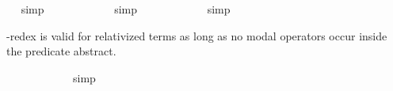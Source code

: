 \begin{isabellebody}
\ %
%
\isamarkupfalse%
\ simp%
%
%
\isanewline
\ \isamarkupfalse%
\ {\isachardoublequoteopen}{\isasymlfloor}{\isacharparenleft}{\isacharparenleft}{\isasymlambda}{\isasymalpha}{\isachardot}\ \isactrlbold {\isasymbox}{\isasymphi}\ {\isasymalpha}{\isacharparenright}\ {\isacharparenleft}{\isasymtau}{\isacharcolon}{\isacharcolon}{\isasymup}{\isasymzero}{\isacharparenright}{\isacharparenright}\ \isactrlbold {\isasymleftrightarrow}\ {\isacharparenleft}\isactrlbold {\isasymbox}{\isasymphi}\ {\isasymtau}{\isacharparenright}{\isasymrfloor}{\isachardoublequoteclose}%
\ %
%
\isamarkupfalse%
\ simp%
%
%
\isanewline
\ \isamarkupfalse%
\ {\isachardoublequoteopen}{\isasymlfloor}{\isacharparenleft}{\isacharparenleft}{\isasymlambda}{\isasymalpha}{\isachardot}\ \isactrlbold {\isasymbox}{\isasymphi}\ {\isasymalpha}{\isacharparenright}\ {\isacharparenleft}{\isasymtau}{\isacharcolon}{\isacharcolon}{\isasymzero}{\isacharparenright}{\isacharparenright}\ \isactrlbold {\isasymleftrightarrow}\ {\isacharparenleft}\isactrlbold {\isasymbox}{\isasymphi}\ {\isasymtau}{\isacharparenright}{\isasymrfloor}{\isachardoublequoteclose}%
\ %
%
\isamarkupfalse%
\ simp%
%
%
%
\begin{isamarkuptext}%
\isa{{\isasymbeta}{\isasymeta}}-redex is valid for relativized terms as long as no modal operators occur inside the predicate abstract.%
\end{isamarkuptext}\isamarkuptrue%
\ \isamarkupfalse%
\ {\isachardoublequoteopen}{\isasymlfloor}{\isacharparenleft}{\isacharparenleft}{\isasymlambda}{\isasymalpha}{\isachardot}\ {\isasymphi}\ {\isasymalpha}{\isacharparenright}\ {\isasymdownharpoonleft}{\isacharparenleft}{\isasymtau}{\isacharcolon}{\isacharcolon}{\isasymup}{\isasymzero}{\isacharparenright}{\isacharparenright}\ \isactrlbold {\isasymleftrightarrow}\ {\isacharparenleft}{\isasymphi}\ {\isasymdownharpoonleft}{\isasymtau}{\isacharparenright}{\isasymrfloor}{\isachardoublequoteclose}%
\ %
%
\isamarkupfalse%
\ simp%
%
%
\isanewline
\ \isamarkupfalse%
\ {\isachardoublequoteopen}{\isasymlfloor}{\isacharparenleft}{\isacharparenleft}{\isasymlambda}{\isasymalpha}{\isachardot}\ \isactrlbold {\isasymbox}{\isasymphi}\ {\isasymalpha}{\isacharparenright}\ {\isasymdownharpoonleft}{\isacharparenleft}{\isasymtau}{\isacharcolon}{\isacharcolon}{\isasymup}{\isasymzero}{\isacharparenright}{\isacharparenright}\ \isactrlbold {\isasymleftrightarrow}\ {\isacharparenleft}\isactrlbold {\isasymbox}{\isasymphi}\ {\isasymdownharpoonleft}{\isasymtau}{\isacharparenright}{\isasymrfloor}{\isachardoublequoteclose}\ \isamarkupfalse%

\end{isabellebody}
